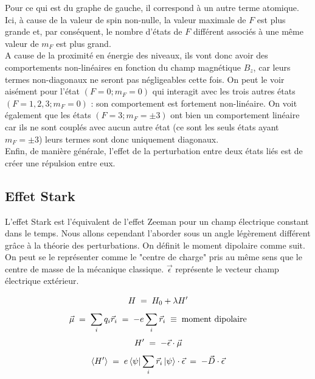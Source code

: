 Pour ce qui est du graphe de gauche, il correspond à un autre terme atomique. Ici, à cause de la valeur de spin non-nulle, la valeur maximale de $F$ est plus grande et, par conséquent, le nombre d'états de $F$ différent associés à une même valeur de $m_F$ est plus grand.\\
A cause de la proximité en énergie des niveaux, ils vont donc avoir des comportements non-linéaires en fonction du champ magnétique $B_z$, car leurs termes non-diagonaux ne seront pas négligeables cette fois. On peut le voir aisément pour l'état $(F = 0;m_F = 0)$ qui interagit avec les trois autres états $(F=1,2,3;m_F = 0)$ : son comportement est fortement non-linéaire. On voit également que les états $(F = 3;m_F = \pm3)$ ont bien un comportement linéaire car ils ne sont couplés avec aucun autre état (ce sont les seuls états ayant $m_F=\pm3$) leurs termes sont donc uniquement diagonaux.\\

Enfin, de manière générale, l'effet de la perturbation entre deux états liés est de créer une répulsion entre eux.




    \subsection{Effet Stark}




L'effet Stark est l'équivalent de l'effet Zeeman pour un champ électrique constant dans le temps. Nous allons cependant l'aborder sous un angle légèrement différent grâce à la théorie des perturbations. On définit le moment dipolaire comme suit. On peut se le représenter comme le "centre de charge" pris au même sens que le centre de masse de la mécanique classique. $\vec{\epsilon}$ représente le vecteur champ électrique extérieur.

\begin{equation*}
    H \; = \; H_0 + \lambda H'
\end{equation*}
\begin{equation*}
    \vec{\mu} \; = \; \sum_i q_i \vec{r}_i \; = \; -e\sum_i \vec{r}_i\;\equiv\; \textrm{moment dipolaire}
\end{equation*}
\begin{equation*}
    H' \; = \; -\vec{\epsilon}\cdot\vec{\mu}
\end{equation*}
\begin{equation*}
    \expval{H'} \; = \; e\bra{\psi}\sum_i\vec{r}_i\ket{\psi}\cdot \vec{\epsilon} \; = \; -\vec{D}\cdot\vec{\epsilon}
\end{equation*}

